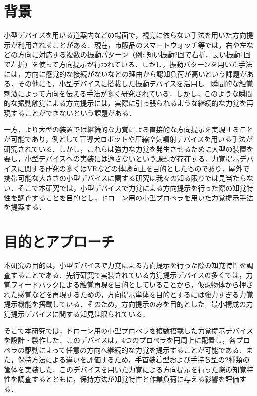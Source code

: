 \documentclass[a4paper,11pt]{jreport}
\begin{document}
\section{背景}
小型デバイスを用いる道案内などの場面で，視覚に依らない手法を用いた方向提示が利用されることがある．現在，市販品のスマートウォッチ等では，右や左などの方向に対応する複数の振動パターン（例: 短い振動2回で右折，長い振動1回で左折）を使って方向提示が行われている．しかし，振動パターンを用いた手法には，方向に感覚的な接続がないなどの理由から認知負荷が高いという課題がある．その他にも，小型デバイスに搭載した振動デバイスを活用し，瞬間的な触覚刺激によって方向を伝える手法が多く研究されている\cite{stock2020feedi}\cite{ntt_burunavi4}．しかし，このような瞬間的な振動触覚による方向提示には，実際に引っ張られるような継続的な力覚を再現することができないという課題がある．

一方，より大型の装置では継続的な力覚による直接的な方向提示を実現することが可能であり，例として盲導犬ロボット\cite{cai2024rdog}や圧縮空気噴射デバイスを用いる手法\cite{ma2024airpush}が研究されている．しかし，これらは強力な力覚を発生させるために大型の装置を要し，小型デバイスへの実装には適さないという課題が存在する．力覚提示デバイスに関する研究の多くはVRなどの体験向上を目的としたものであり，屋外で携帯可能な大きさの小型デバイスに関する研究は我々の知る限りでは見当たらない．そこで本研究では，小型デバイスで力覚による方向提示を行った際の知覚特性を調査することを目的とし，ドローン用の小型プロペラを用いた力覚提示手法を提案する．

\section{目的とアプローチ}
本研究の目的は，小型デバイスで力覚による方向提示を行った際の知覚特性を調査することである．先行研究で実装されている力覚提示デバイスの多くでは，力覚フィードバックによる触覚再現を目的としていることから，仮想物体から押された感覚などを再現するための，方向提示単体を目的とするには強力すぎる力覚提示機能を搭載している．そのため，方向提示のみを目的とした，最小構成の力覚提示デバイスに関する知見は限られている．

そこで本研究では，ドローン用の小型プロペラを複数搭載した力覚提示デバイスを設計・製作した．このデバイスは，4つのプロペラを円周上に配置し，各プロペラの駆動によって任意の方向へ継続的な力覚を提示することが可能である．また，保持方法による違いを評価するため，手首装着型および手持ち型の2種類の筐体を実装した．このデバイスを用いた力覚による方向提示を行った際の知覚特性を調査するとともに，保持方法が知覚特性と作業負荷に与える影響を評価する．
\end{document}
